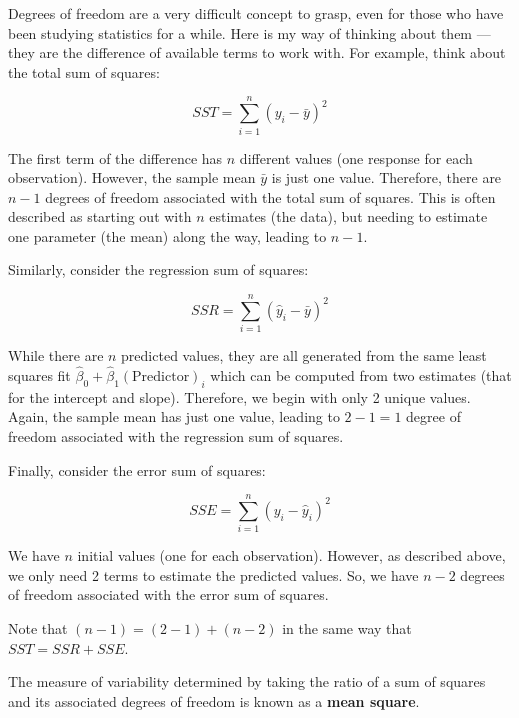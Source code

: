 \documentclass[
]{book}
\theoremstyle{plain}
\theoremstyle{mydefn}
\theoremstyle{myexmpl}
\theoremstyle{remark}
\begin{document}
\begin{rmdtip}
Degrees of freedom are a very difficult concept to grasp, even for those who have been studying statistics for a while. Here is my way of thinking about them --- they are the difference of available terms to work with. For example, think about the total sum of squares:

\[SST = \sum_{i=1}^{n} \left(y_i - \bar{y}\right)^2\]

The first term of the difference has \(n\) different values (one response for each observation). However, the sample mean \(\bar{y}\) is just one value. Therefore, there are \(n - 1\) degrees of freedom associated with the total sum of squares. This is often described as starting out with \(n\) estimates (the data), but needing to estimate one parameter (the mean) along the way, leading to \(n - 1\).

Similarly, consider the regression sum of squares:

\[SSR = \sum_{i=1}^{n} \left(\widehat{y}_i - \bar{y}\right)^2\]

While there are \(n\) predicted values, they are all generated from the same least squares fit \(\widehat{\beta}_0 + \widehat{\beta}_1 (\text{Predictor})_i\) which can be computed from two estimates (that for the intercept and slope). Therefore, we begin with only 2 unique values. Again, the sample mean has just one value, leading to \(2 - 1 = 1\) degree of freedom associated with the regression sum of squares.

Finally, consider the error sum of squares:

\[SSE = \sum_{i=1}^{n} \left(y_i - \widehat{y}_i\right)^2\]

We have \(n\) initial values (one for each observation). However, as described above, we only need 2 terms to estimate the predicted values. So, we have \(n - 2\) degrees of freedom associated with the error sum of squares.

Note that \((n - 1) = (2 - 1) + (n - 2)\) in the same way that \(SST = SSR + SSE\).
\end{rmdtip}

The measure of variability determined by taking the ratio of a sum of squares and its associated degrees of freedom is known as a \textbf{mean square}.
\end{document}
